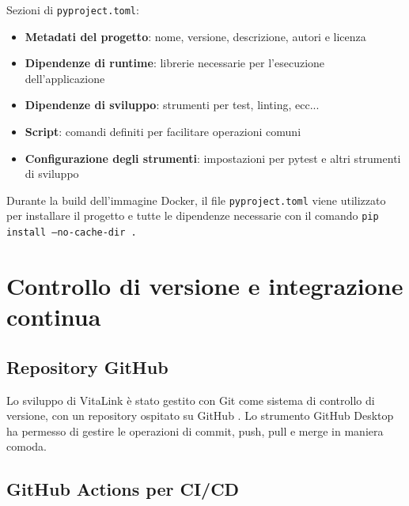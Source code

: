 \documentclass[12pt,a4paper,oneside]{report}
\begin{document}
Sezioni di \texttt{pyproject.toml}:

\begin{itemize}
    \item \textbf{Metadati del progetto}: nome, versione, descrizione, autori e licenza
    \item \textbf{Dipendenze di runtime}: librerie necessarie per l'esecuzione dell'applicazione
    \item \textbf{Dipendenze di sviluppo}: strumenti per test, linting, ecc...
    \item \textbf{Script}: comandi definiti per facilitare operazioni comuni
    \item \textbf{Configurazione degli strumenti}: impostazioni per pytest e altri strumenti di sviluppo
\end{itemize}

Durante la build dell'immagine Docker, il file \texttt{pyproject.toml} viene utilizzato per installare il progetto e tutte le dipendenze necessarie con il comando \texttt{pip install --no-cache-dir .}

\section{Controllo di versione e integrazione continua}
\subsection{Repository GitHub}
Lo sviluppo di VitaLink è stato gestito con Git come sistema di controllo di versione, con un repository ospitato su GitHub \cite{github}.
Lo strumento GitHub Desktop \cite{gitdesktop}ha permesso di gestire le operazioni di commit, push, pull e merge in maniera comoda.

\subsection{GitHub Actions per CI/CD}
\end{document}
